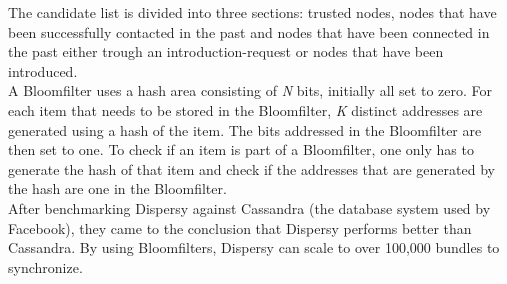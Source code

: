 \documentclass[11pt]{article}
\begin{document}
The candidate list is divided into three sections: trusted nodes, nodes that have been successfully contacted in the past and nodes that have been connected in the past either trough an introduction-request or nodes that have been introduced.\\

A Bloomfilter uses a hash area consisting of \emph{N} bits, initially all set to zero. For each item that needs to be stored in the Bloomfilter, \emph{K} distinct addresses are generated using a hash of the item. The bits addressed in the Bloomfilter are then set to one. To check if an item is part of a Bloomfilter, one only has to generate the hash of that item and check if the addresses that are generated by the hash are one in the Bloomfilter.\\

After benchmarking Dispersy against Cassandra (the database system used by Facebook), they came to the conclusion that Dispersy performs better than Cassandra. By using Bloomfilters, Dispersy can scale to over 100,000 bundles to synchronize.
\end{document}
